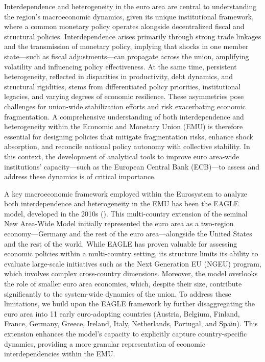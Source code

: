 \documentclass[paper=letter, fontsize=12pt]{article}
\begin{document}
Interdependence and heterogeneity in the euro area are central to understanding the region's macroeconomic dynamics, given its unique institutional framework, where a common monetary policy operates alongside decentralized fiscal and structural policies. Interdependence arises primarily through strong trade linkages and the transmission of monetary policy, implying that shocks in one member state—such as fiscal adjustments—can propagate across the union, amplifying volatility and influencing policy effectiveness. At the same time, persistent heterogeneity, reflected in disparities in productivity, debt dynamics, and structural rigidities, stems from differentiated policy priorities, institutional legacies, and varying degrees of economic resilience. These asymmetries pose challenges for union-wide stabilization efforts and risk exacerbating economic fragmentation. A comprehensive understanding of both interdependence and heterogeneity within the Economic and Monetary Union (EMU) is therefore essential for designing policies that mitigate fragmentation risks, enhance shock absorption, and reconcile national policy autonomy with collective stability. In this context, the development of analytical tools to improve euro area-wide institutions' capacity—such as the European Central Bank (ECB)—to assess and address these dynamics is of critical importance.


A key macroeconomic framework employed within the Eurosystem to analyze both interdependence and heterogeneity in the EMU has been the EAGLE model, developed in the 2010s (\cite[Gomes et al. (2012)]{Gomes}). This multi-country extension of the seminal New Area-Wide Model initially represented the euro area as a two-region economy—Germany and the rest of the euro area—alongside the United States and the rest of the world. While EAGLE has proven valuable for assessing economic policies within a multi-country setting, its structure limits its ability to evaluate large-scale initiatives such as the Next Generation EU (NGEU) program, which involves complex cross-country dimensions. Moreover, the model overlooks the role of smaller euro area economies, which, despite their size, contribute significantly to the system-wide dynamics of the union. To address these limitations, we build upon the EAGLE framework by further disaggregating the euro area into 11 early euro-adopting countries (Austria, Belgium, Finland, France, Germany, Greece, Ireland, Italy, Netherlands, Portugal, and Spain). This extension enhances the model's capacity to explicitly capture country-specific dynamics, providing a more granular representation of economic interdependencies within the EMU.
\end{document}
